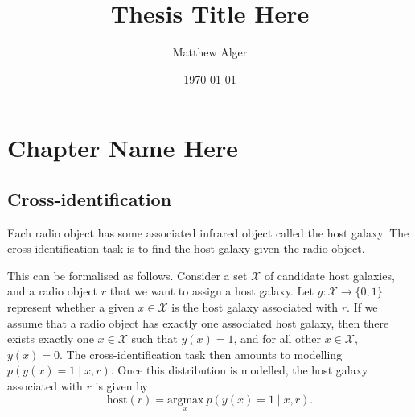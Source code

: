 \documentclass[11pt]{book}
\title{Thesis Title Here}
\author{Matthew Alger}
\date{\today}
\begin{document}
\pagestyle{empty}
\thispagestyle{empty}




\cleardoublepage
\pagestyle{empty}


\cleardoublepage
\pagestyle{empty}


\cleardoublepage
\pagestyle{headings}


\cleardoublepage
\pagestyle{headings}
\tableofcontents

\mainmatter

% 

% 
% 

\chapter{Chapter Name Here}

\section{Cross-identification}
\label{sec:cross-identification}

    Each radio object has some associated infrared object called the host galaxy. The cross-identification task is to find the host galaxy given the radio object.
    
    This can be formalised as follows. Consider a set $\mathcal X$ of candidate host galaxies, and a radio object $r$ that we want to assign a host galaxy. Let $y : \mathcal X \to \{0, 1\}$ represent whether a given $x \in \mathcal X$ is the host galaxy associated with $r$. If we assume that a radio object has exactly one associated host galaxy, then there exists exactly one $x \in \mathcal X$ such that $y(x) = 1$, and for all other $x \in \mathcal X$, $y(x) = 0$. The cross-identification task then amounts to modelling $p(y(x) = 1 \mid x, r)$. Once this distribution is modelled, the host galaxy associated with $r$ is given by
    \begin{equation}
        \label{eq:cross-identification}
        \mbox{host}(r) = \underset{x}{\mbox{argmax}}\ p(y(x) = 1 \mid x, r).
    \end{equation}
\end{document}
